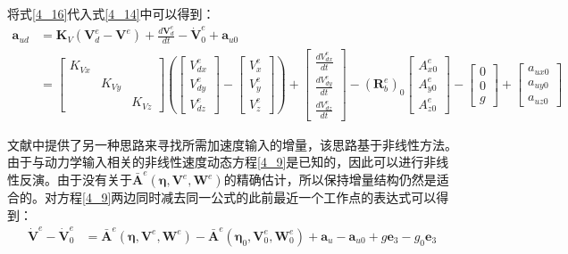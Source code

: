 将式\eqref{4_16}代入式\eqref{4_14}中可以得到：
\begin{equation}
    \begin{aligned}
        \boldsymbol{a}_{ud}&=\boldsymbol{K}_{V}(\boldsymbol{V}_d^e-\boldsymbol{V}^e)+\frac{d\boldsymbol{V}^e_d}{dt}-\boldsymbol{\dot{V}}^e_0+\boldsymbol{a}_{u0}\\
        &= \left[\begin{array}{ccc}{K}_{V x} & & \\& {K}_{V y} & \\& & {K}_{V z}\end{array}\right]
        \left (\begin{bmatrix}V^e_{dx} \\ V^e_{dy} \\ V^e_{dz} \end{bmatrix}-\begin{bmatrix}V^e_{x} \\ V^e_{y} \\ V^e_{z}
        \end{bmatrix}\right )+
        \begin{bmatrix}\frac{dV^e_{dx}}{dt} \\\frac{dV^e_{dy}}{dt} \\\frac{dV^e_{dz}}{dt}
        \end{bmatrix}-
        (\boldsymbol{R}_b^e)_0\begin{bmatrix}A_{x0}^e \\A_{y0}^e \\A_{z0}^e\end{bmatrix}-
        \begin{bmatrix}0 \\0 \\g\end{bmatrix}+
        \begin{bmatrix}a_{ux0} \\a_{uy0} \\a_{uz0}\end{bmatrix}
    \end{aligned}
    \label{4_18}
\end{equation}

文献\parencite{smeurCascadedIncrementalNonlinear2018b}中提供了另一种思路来寻找所需加速度输入的增量，该思路基于非线性方法。由于与动力学输入相关的非线性速度动态方程\eqref{4_9}是已知的，因此可以进行非线性反演。由于没有关于${\boldsymbol{\bar A}}^e(\boldsymbol{\eta},\boldsymbol{V}^e,\boldsymbol{W}^e)$的精确估计，所以保持增量结构仍然是适合的。对方程\eqref{4_9}两边同时减去同一公式的此前最近一个工作点的表达式可以得到：
\begin{equation}
    \begin{aligned}
        \dot{\boldsymbol{V}}^e - \dot{\boldsymbol{V}}^e_0&=
        {\boldsymbol{\bar A}}^e(\boldsymbol{\eta},\boldsymbol{V}^e,\boldsymbol{W}^e) - {\boldsymbol{\bar A}}^e(\boldsymbol{\eta}_0,\boldsymbol{V}^e_0,\boldsymbol{W}^e_0) +\boldsymbol{a}_u - \boldsymbol{a}_{u0}+g\boldsymbol{e}_3 - g_0\boldsymbol{e}_3
    \end{aligned}
    \label{4_19}
\end{equation}

